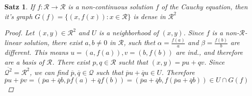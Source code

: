 \documentclass[headsepline=true,DIV=11]{scrartcl}
\newtheorem{theorem}{Satz}
\theoremstyle{definition}
\renewcommand{\bar}[1]{\overline{#1}}
\begin{document}
\begin{theorem}
	If $f\colon \mathcal R\to\mathcal R$ is a non-continuous solution $f$ of the Cauchy equation, then it's graph $G(f)=\{(x, f(x))\colon x\in \mathcal R\}$ is dense in $\mathcal R^2$
	\begin{proof}
		Let $(x,y)\in \mathcal R^2$ and $U$ is a neighborhood of $(x,y)$.
		Since $f$ is a non-$\mathcal R$-linear solution, there exist $a,b\neq 0$ in $\mathcal R$, such thet $\alpha=\frac{f(a)}{a}$ and $\beta= \frac{f(b)}{b}$ are different.
		This means $u=(a,f(a)), v=(b,f(b))$ are ind., and therefore are a basis of $\mathcal R$.
		There exist $p,q\in \mathcal R$ sucht that $(x,y)=pu+qv$.
		Since $\bar{\mathcal Q^2}= \mathcal R^2$, we can find $\bar p, \bar q \in \mathcal Q$ such that $\bar pu+\bar qu \in U$. 
		Therefore $\bar pu+\bar pv= (\bar pa + \bar qb, \bar pf(a)+\bar qf(b)) = (\bar pa+\bar qb, f(\bar pa+ \bar qb))\in U\cap G(f)$
	\end{proof}
\end{theorem}
\end{document}
